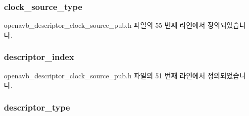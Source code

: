 \subsubsection[{\texorpdfstring{clock\+\_\+source\+\_\+type}{clock_source_type}}]{ clock\+\_\+source\+\_\+type}\hypertarget{structopenavb__aem__descriptor__clock__source__t_a13c1478145adf7e4fde43228d4e1c3df}{}\label{structopenavb__aem__descriptor__clock__source__t_a13c1478145adf7e4fde43228d4e1c3df}


openavb\+\_\+descriptor\+\_\+clock\+\_\+source\+\_\+pub.\+h 파일의 55 번째 라인에서 정의되었습니다.

\subsubsection[{\texorpdfstring{descriptor\+\_\+index}{descriptor_index}}]{ descriptor\+\_\+index}\hypertarget{structopenavb__aem__descriptor__clock__source__t_ab26fb363c24b9a2a4391f9171c981b08}{}\label{structopenavb__aem__descriptor__clock__source__t_ab26fb363c24b9a2a4391f9171c981b08}


openavb\+\_\+descriptor\+\_\+clock\+\_\+source\+\_\+pub.\+h 파일의 51 번째 라인에서 정의되었습니다.

\subsubsection[{\texorpdfstring{descriptor\+\_\+type}{descriptor_type}}]{ descriptor\+\_\+type}\hypertarget{structopenavb__aem__descriptor__clock__source__t_a1e231d7874aada5925b29affc76782cc}{}\label{structopenavb__aem__descriptor__clock__source__t_a1e231d7874aada5925b29affc76782cc}


